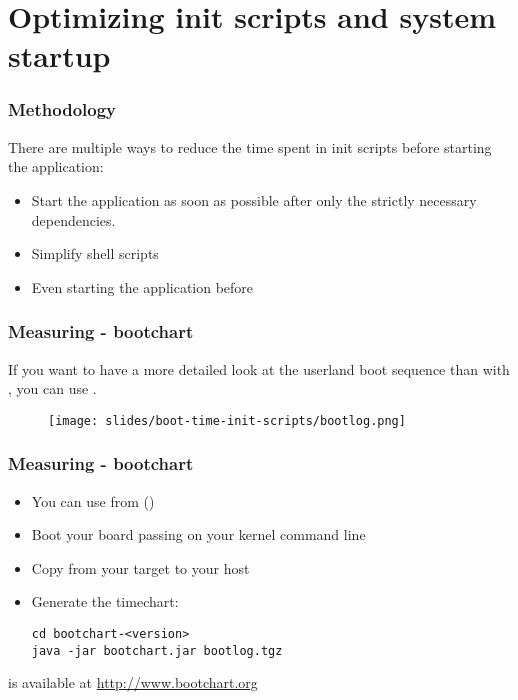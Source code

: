 \section{Optimizing init scripts and system startup}
\begin{frame}
\frametitle{Methodology}
There are multiple ways to reduce the time spent in init scripts before
starting the application:
\begin{itemize}
	\item Start the application as soon as possible after only the
              strictly necessary dependencies.
	\item Simplify shell scripts
	\item Even starting the application before 
\end{itemize}
\end{frame}

\begin{frame}
\frametitle{Measuring - bootchart}
If you want to have a more detailed look at the userland boot sequence
than with , you can use .
\begin{figure}[h!]
	\centering
	\texttt{[image: slides/boot-time-init-scripts/bootlog.png]}
\end{figure}
\end{frame}

\begin{frame}[fragile]
\frametitle{Measuring - bootchart}
\begin{itemize}
	\item You can use  from 
	      ()
	\item Boot your board passing  on your
	      kernel command line
	\item Copy  from your target to your host
	\item Generate the timechart:
\begin{block}{}
\begin{verbatim}
cd bootchart-<version>
java -jar bootchart.jar bootlog.tgz
\end{verbatim}
\end{block}
\end{itemize}
 is available at \url{http://www.bootchart.org}
\end{frame}

